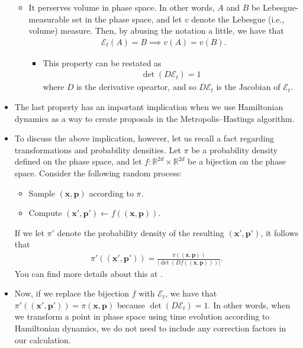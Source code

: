 \documentclass[10pt]{article}
\newcommand{\ve}[1]{\mathbf{#1}}
\newcommand{\mcal}[1]{\mathcal{#1}}
\newcommand{\Real}{\mathbb{R}}
\begin{document}
\begin{itemize}
\begin{itemize}
    \item It perserves volume in phase space. In other words, $A$ and $B$ be Lebesgue-measurable set in the phase space, and let $v$ denote the Lebesgue (i.e., volume) measure. Then, by abusing the notation a little, we have that
    \begin{align*}
      \mcal{E}_t(A) = B \implies v(A) = v(B).
    \end{align*}
    \begin{itemize}
      \item This property can be restated as
      \begin{align*}
        \det(D\mcal{E}_t) = 1
      \end{align*}
      where $D$ is the derivative opeartor, and so $D\mcal{E}_t$ is the Jacobian of $\mcal{E}_t$.
    \end{itemize}
  \end{itemize}

  \item The last property has an important implication when we use Hamiltonian dynamics as a way to create proposals in the Metropolis--Hastings algorithm.

  \item To discuss the above implication, however, let us recall a fact regarding transformations and probability densities. Let $\pi$ be a probability density defined on the phase space, and let $f: \Real^{2d} \times \Real^{2d}$ be a bijection on the phase space. Consider the following random process:
  \begin{itemize}
    \item Sample $(\ve{x},\ve{p})$ according to $\pi$.
    \item Compute $(\ve{x}',\ve{p}') \gets f((\ve{x},\ve{p})).$
  \end{itemize}
  If we let $\pi'$ denote the probability density of the resulting $(\ve{x}',\ve{p}')$, it follows that
  \begin{align*}
    \pi'((\ve{x}', \ve{p}')) = \frac{\pi((\ve{x},\ve{p}))}{|\det(Df((\ve{x},\ve{p})))|}.
  \end{align*}
  You can find more details about this at \cite{Khungurn:2022}.

  \item Now, if we replace the bijection $f$ with $\mcal{E}_t$, we have that $\pi'((\ve{x}',\ve{p}')) = \pi(\ve{x},\ve{p})$ because $\det(D\mcal{E}_t) = 1$. In other words, when we transform a point in phase space using time evolution according to Hamiltonian dynamics, we do not need to include any correction factors in our calculation.
\end{itemize}
\end{document}
